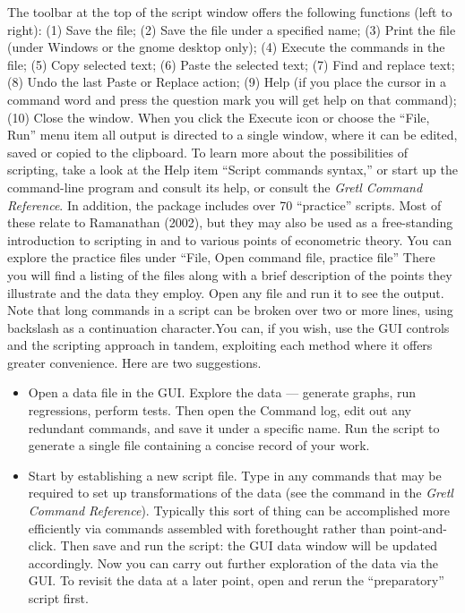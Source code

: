 The toolbar at the top of the script window offers the following
functions (left to right): (1) Save the file; (2) Save the file under
a specified name; (3) Print the file (under Windows or the gnome
desktop only); (4) Execute the commands in the file; (5) Copy selected
text; (6) Paste the selected text; (7) Find and replace text; (8) Undo
the last Paste or Replace action; (9) Help (if you place the cursor in
a command word and press the question mark you will get help on that
command); (10) Close the window.  When you click the Execute icon or
choose the ``File, Run'' menu item all output is directed to a single
window, where it can be edited, saved or copied to the clipboard.  To
learn more about the possibilities of scripting, take a look at the
 Help item ``Script commands syntax,'' or start up the
command-line program  and consult its help, or consult
the \emph{Gretl Command Reference}. In addition, the 
package includes over 70 ``practice'' scripts.  Most of these relate
to Ramanathan (2002), but they may also be used as a free-standing
introduction to scripting in  and to various points of
econometric theory.  You can explore the practice files under ``File,
Open command file, practice file'' There you will find a listing of
the files along with a brief description of the points they illustrate
and the data they employ.  Open any file and run it to see the output.
Note that long commands in a script can be broken over two or more
lines, using backslash as a continuation character.You can, if you
wish, use the GUI controls and the scripting approach in tandem,
exploiting each method where it offers greater convenience.  Here are
two suggestions.
\begin{itemize}
\item Open a data file in the GUI.  Explore the data --- generate
  graphs, run regressions, perform tests.  Then open the Command log,
  edit out any redundant commands, and save it under a specific name.
  Run the script to generate a single file containing a concise record
  of your work.
\item Start by establishing a new script file.  Type in any commands
  that may be required to set up transformations of the data (see the
   command in the \emph{Gretl Command Reference}). Typically
  this sort of thing can be accomplished more efficiently via commands
  assembled with forethought rather than point-and-click. Then save
  and run the script: the GUI data window will be updated accordingly.
  Now you can carry out further exploration of the data via the GUI.
  To revisit the data at a later point, open and rerun the
  ``preparatory'' script first.
\end{itemize}



